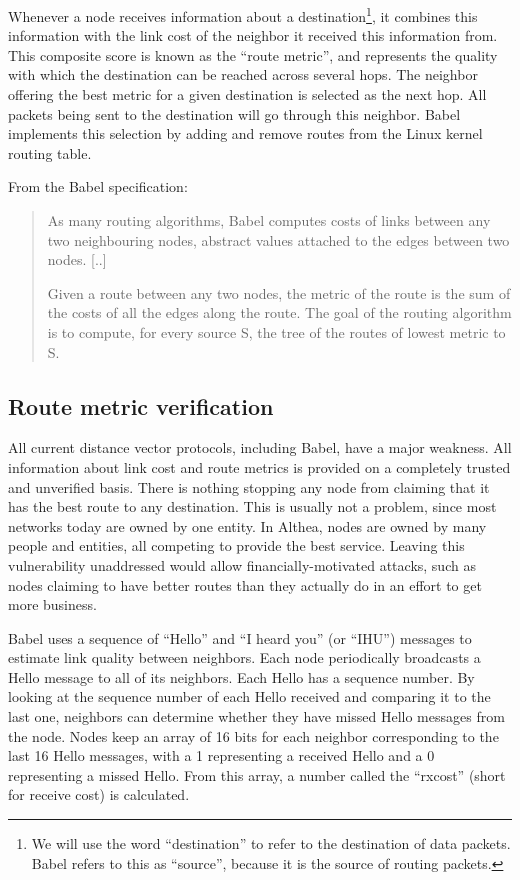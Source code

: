 \documentclass[11pt]{article}
\begin{document}
Whenever a node receives information about a destination\footnote{We will use the word ``destination'' to refer to the destination of data packets. Babel refers to this as ``source'', because it is the source of routing packets.}, it combines this information with the link cost of the neighbor it received this information from. This composite score is known as the ``route metric'', and represents the quality with which the destination can be reached across several hops. The neighbor offering the best metric for a given destination is selected as the next hop. All packets being sent to the destination will go through this neighbor. Babel implements this selection by adding and remove routes from the Linux kernel routing table.
 
\begin{minipage}[c]{\textwidth}
From the Babel specification:
\begin{quote}
As many routing algorithms, Babel computes costs of links between any two neighbouring nodes, abstract values attached to the edges between two nodes.  [..]

Given a route between any two nodes, the metric of the route is the sum of the costs of all the edges along the route. The goal of the routing algorithm is to compute, for every source S, the tree of the routes of lowest metric to S.
\end{quote}
\end{minipage}

\subsection{Route metric verification}
All current distance vector protocols, including Babel, have a major weakness. All information about link cost and route metrics is provided on a completely trusted and unverified basis. There is nothing stopping any node from claiming that it has the best route to any destination. This is usually not a problem, since most networks today are owned by one entity. In Althea, nodes are owned by many people and entities, all competing to provide the best service. Leaving this vulnerability unaddressed would allow financially-motivated attacks, such as nodes claiming to have better routes than they actually do in an effort to get more business.
 
Babel uses a sequence of ``Hello'' and ``I heard you'' (or ``IHU'') messages to estimate link quality between neighbors. Each node periodically broadcasts a Hello message to all of its neighbors. Each Hello has a sequence number. By looking at the sequence number of each Hello received and comparing it to the last one, neighbors can determine whether they have missed Hello messages from the node. Nodes keep an array of 16 bits for each neighbor corresponding to the last 16 Hello messages, with a 1 representing a received Hello and a 0 representing a missed Hello. From this array, a number called the ``rxcost'' (short for receive cost) is calculated.
\end{document}
